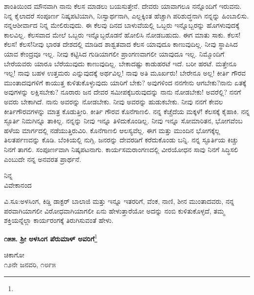 ಶಾಂತಿಯಿಂದ ಮೌನವಾಗಿ ನಾನು ಕೆಲಸ ಮಾಡಲು ಬಯಸುತ್ತೇನೆ. ದೇವರು ಯಾವಾಗಲೂ ನನ್ನೊಂದಿಗೆ ಇರುವನು. ನಿನ್ನ ಕೈಲಾದರೆ ಸಂಪೂರ್ಣ ನಿಷ್ಕಪಟಿಯಾಗಿ, ನಿಃಸ್ವಾರ್ಥನಾಗಿ, ಎಲ್ಲಕ್ಕಿಂತ ಹೆಚ್ಚಾಗಿ ಪರಿಶುದ್ಧನಾಗಿ ನನ್ನನ್ನು ಹಿಂಬಾಲಿಸು. ನನ್ನ\break ಆಶೀರ್ವಾದ ನಿನ್ನ ಮೇಲಿರುವುದು. ಈ ಕೆಲವು ದಿನದ ಬಾಳುವೆಯಲ್ಲಿ ಒಬ್ಬರು ಇನ್ನೊಬ್ಬರನ್ನು ಹೊಗಳುವುದಕ್ಕೆ ಕಾಲವಿಲ್ಲ. ಕೆಲಸವಾದ ಮೇಲೆ ಒಬ್ಬರು ಇನ್ನೊಬ್ಬರೊಡನೆ ಹೋಲಿಸಿ ನೋಡಬಹುದು. ಈಗ ಮಾತು ಸಾಕು. ಕೆಲಸ! ಕೆಲಸ! ಕೆಲಸ!ನೀವು ಭಾರತ ದೇಶದಲ್ಲಿ ಮಾಡಿದ ಶಾಶ್ವತವಾದ ಕೆಲಸ ಯಾವುದೂ ಕಾಣುವುದಿಲ್ಲ. ನೀವು ಸ್ಥಾಪಿಸಿದ ಯಾವ ಕೇಂದ್ರವೂ ಇಲ್ಲ. ನೀವು ಕಟ್ಟಿಸಿದ ಗುಡಿಯಾಗಲೀ ಪ್ರಾಂಗಣವಾಗಲೀ ಯಾವುದೂ ಇಲ್ಲ. ನಿಮ್ಮೊಂದಿಗೆ ಬೇರೆಯವರು ಯಾರೂ ಬೆರೆಯುವುದು ಕಾಣುವುದಿಲ್ಲ. ಬೇಕಾದಷ್ಟು ಕಾಡುಹರಟೆ ಇದೆ. ಬರೀ ಹರಟೆ. ಮತ್ತೇನೂ ಇಲ್ಲ! ನಾವು ಬಹಳ ಉತ್ತಮರು ಎನ್ನುವುದಕ್ಕೆ ಅರ್ಥವಿಲ್ಲ! ನಾವು ಅತಿ ಮೂರ್ಖರು! ಬೇರೇನೂ ಅಲ್ಲ! ಕೀರ್ತಿ ಗೌರವ ಮುಂತಾದವುಗಳಿಗೆ ಕಾಯುತ್ತ ಕುಳಿತುಕೊಳ್ಳುವುದು ಯಾರಿಗೆ ಬೇಕು? ಅವುಗಳಿಂದ ನನಗೇನು ಆಗಬೇಕು?ನಾನು ಏತಕ್ಕೆ ಅವುಗಳನ್ನು ಲಕ್ಷಿಸಬೇಕು? ನೂರಾರು ಜನ ದೇವರ ಸಮೀಪಕ್ಕೆ\break ಬರುವುದನ್ನು ನಾನು ನೋಡಬೇಕು! ಅವರೆಲ್ಲಿ? ನನಗೆ ಅವರು ಬೇಕಾಗಿದೆ. ನಾನು ಅವರನ್ನು ನೋಡಬೇಕು. ನೀವು ಅವರನ್ನು ಹುಡುಕಬೇಕು. ನೀವು ನನಗೆ ಕೇವಲ ಕೀರ್ತಿಗೌರವಗಳನ್ನು ಮಾತ್ರ ಕೊಡುತ್ತೀರಿ. ಕೀರ್ತಿ ಗೌರವ ಕೊನೆಗಾಣಲಿ. ನನ್ನ ಕೆಚ್ಚೆದೆಯ ಮಕ್ಕಳೆ! ಕೆಲಸಕ್ಕೆ ಕೈಹಾಕಿ. ನನ್ನ ಸ್ಫೂರ್ತಿ ನಿಮಗಿನ್ನೂ ತಾಕಿಲ್ಲ. ನನ್ನನ್ನು ನೀವು ಇನ್ನೂ ತಿಳಿದುಕೊಂಡಿಲ್ಲ. ನೀವು ಇನ್ನೂ ಸೋಮಾರಿತನ, ಭೋಗವೆಂಬ ಹಳೆಯ ಮಾರ್ಗದಲ್ಲಿ ನಡೆಯುತ್ತಿರುವಿರಿ. ಕೊನೆಗಾಣಲಿ ಆಲಸ್ಯವೆಲ್ಲ. ಈಗ ಮತ್ತು ಮುಂದಿನ ಭೋಗಕ್ಕೆಲ್ಲ ತಿಲತರ್ಪಣವನ್ನು ಕೊಡಿ. ಬೆಂಕಿಯಲ್ಲಿ ನುಗ್ಗಿ. ಜನರನ್ನು ದೇವರಡಿಗೆ ಕರೆದುಕೊಂಡು ಬನ್ನಿ. ನನ್ನ ಸ್ಫೂರ್ತಿಯ ಕಿಚ್ಚು ನಿನಗೆ ತಾಗಲಿ. ಸಂಪೂರ್ಣವಾಗಿ ನಿಷ್ಕಪಟನಾಗು. ಕಾರ್ಯಸಮರಾಂಗಣದಲ್ಲಿ ವೀರಯೋಧನ ಸಾವು ನಿನಗೆ ಸಿದ್ಧಿಸಲಿ ಎಂಬುದೇ ನನ್ನ ಅನವರತ ಪ್ರಾರ್ಥನೆ.

\vspace{-0.5cm}

{\flushright
ನಿನ್ನ\\ವಿವೇಕಾನಂದ\par}

ವಿ.ಸೂ:\enginline{-}ಅಳಸಿಂಗ, ಕಿಡ್ಡಿ ಡಾಕ್ಟರ್ ಬಾಲಾಜಿ ಮತ್ತು ಇನ್ನೂ ಇತರರಿಗೆ, ವೆಂಕ, ನಾಣಿ, ಶೀನ ಮುಂತಾದವರು, ನನ್ನ ಪರವಾಗಿಯಾಗಲೀ ವಿರೋಧವಾಗಿಯಾಗಲೀ ಏನು ಹೇಳುತ್ತಾರೆಯೋ ಅದನ್ನು ನಂಬಿ ಕುಳಿತುಕೊಳ್ಳದೆ, ತಮ್ಮ ಶಕ್ತಿಯನ್ನೆಲ್ಲಾ ಕಾರ್ಯರಂಗಕ್ಕೆ ತಿರುಗಿಸುವಂತೆ ಹೇಳು.
\vspace{-0.3cm}

\begin{center}
\textbf{೧೫೫. ಶ‍್ರೀ ಅಳಸಿಂಗ ಪೆರುಮಾಳ್ ಅವರಿಗೆ}\footnote{}
\end{center}
\vspace{-0.7cm}

\begin{flushright}
ಚಿಕಾಗೋ\\೧೨ನೇ ಜನವರಿ, ೧೮೯೫
\end{flushright}
\vspace{-0.3cm}

